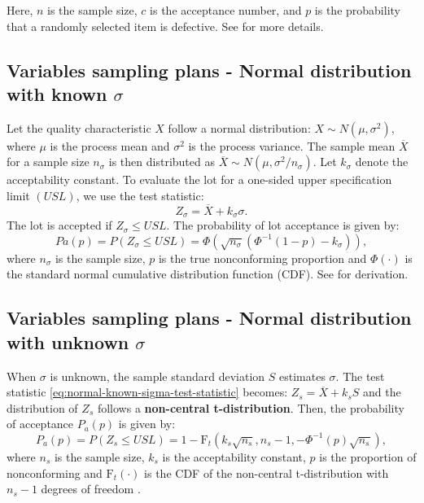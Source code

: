 Here, \(n\) is the sample size, \(c\) is the acceptance number, and \(p\)
is the probability that a randomly selected item is defective.
See \citet{schilling2012acceptance} for more details.

\subsection{\texorpdfstring{Variables sampling plans - Normal distribution with known \(\sigma\)}{Variables sampling plans - Normal distribution with known \textbackslash sigma}}\label{variables-sampling-plans---normal-distribution-with-known-sigma}

Let the quality characteristic \(X\) follow a normal distribution:
\(X \sim N(\mu, \sigma^2)\), where \(\mu\) is the process mean and \(\sigma^2\) is
the process variance. The sample mean \(\overline{X}\) for a sample size
\(n_{\sigma}\) is then distributed as
\(\overline{X} \sim N(\mu, \sigma^2 / n_{\sigma})\). Let \(k_{\sigma}\) denote
the acceptability constant. To evaluate the lot for a one-sided upper specification
limit \((USL)\), we use the test statistic:
\begin{equation}
Z_{\sigma} = \overline{X} + k_{\sigma}\sigma. 
  \label{eq:normal-known-sigma-test-statistic}
\end{equation}
The lot is accepted if \(Z_{\sigma} \leq USL\).
The probability of lot acceptance is given by:
\begin{equation}
Pa(p) = P(Z_{\sigma} \leq USL) = \Phi\left(\sqrt{n_{\sigma}} \left( \Phi^{-1}(1 - p) - k_{\sigma} \right) \right), 
  \label{eq:normal-known-sigma-pa}
\end{equation}
where \(n_{\sigma}\) is the sample size, \(p\) is the true nonconforming proportion
and \(\Phi(\cdot)\) is the standard normal cumulative distribution function (CDF).
See \citet{wilrich2004single} for derivation.

\subsection{\texorpdfstring{Variables sampling plans - Normal distribution with unknown \(\sigma\)}{Variables sampling plans - Normal distribution with unknown \textbackslash sigma}}\label{variables-sampling-plans---normal-distribution-with-unknown-sigma}

When \(\sigma\) is unknown, the sample standard deviation \(S\) estimates \(\sigma\).
The test statistic \eqref{eq:normal-known-sigma-test-statistic} becomes:
\(Z_s = \overline{X} + k_s S\)
and the distribution of \(Z_s\) follows a \textbf{non-central t-distribution}.
Then, the probability of acceptance \(P_a(p)\) is given by:
\begin{equation}
P_a(p) = P(Z_s \leq USL) = 1 - \text{F}_t\left(k_s \sqrt{n_s}, n_s - 1, -\Phi^{-1}(p) \sqrt{n_s}\right), 
  \label{eq:normal-unknown-sigma-pa}
\end{equation}
where \(n_s\) is the sample size, \(k_s\) is the acceptability constant,
\(p\) is the proportion of nonconforming and \(\text{F}_t(\cdot)\) is the CDF of
the non-central t-distribution with \(n_s - 1\) degrees of freedom \citep{wilrich2004single}.

